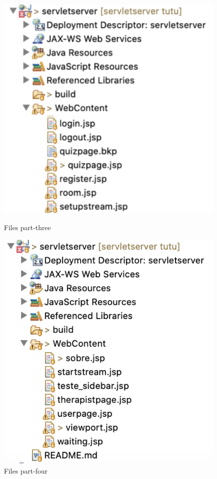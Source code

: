 \begin{figure}[!htbp]
\center
\begin{minipage}{0.495\linewidth}
\center
\captionsetup{justification=centering,margin=0cm,font=small}
\includegraphics[width=0.8\linewidth]{img/cap5/files03}
\caption{Files part-three} \label{fig:files03}
\end{minipage}
\begin{minipage}{0.495\linewidth}
\center
\captionsetup{justification=centering,margin=0cm,font=small}
\includegraphics[width=0.8\linewidth]{img/cap5/files04}
\caption{Files part-four} \label{fig:files04}
\end{minipage}
\end{figure}


